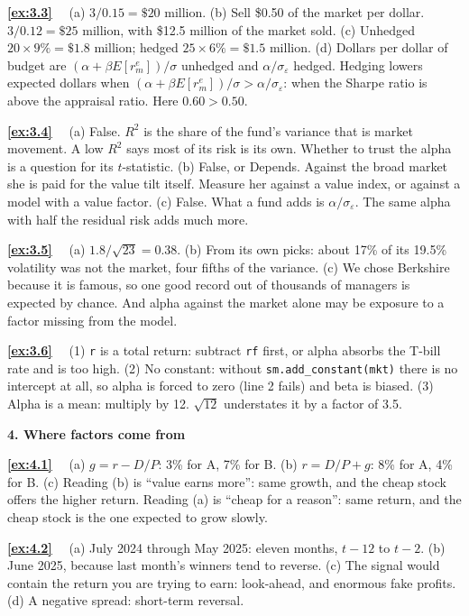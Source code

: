 \documentclass[11pt]{article}
\newcounter{ex}[section]
\newcommand{\sol}[1]{\par\smallskip\textbf{\ref{#1}}\ \ }
\newcommand{\head}[1]{\par\medskip\textbf{#1}\par}
\newcommand{\re}{r^{e}}
\begin{document}
{\sol{ex:3.3} (a) $3/0.15 = \$20$ million. (b) Sell \$0.50 of the market per dollar. $3/0.12 = \$25$ million, with \$12.5
million of the market sold. (c) Unhedged $20\times 9\% = \$1.8$ million; hedged $25\times 6\% = \$1.5$ million. (d) Dollars per
dollar of budget are $(\alpha + \beta E[\re_{m}])/\sigma$ unhedged and $\alpha/\sigma_{\varepsilon}$ hedged. Hedging lowers
expected dollars when $(\alpha + \beta E[\re_{m}])/\sigma > \alpha/\sigma_{\varepsilon}$: when the Sharpe ratio is above the
appraisal ratio. Here $0.60 > 0.50$.

\sol{ex:3.4} (a) False. $R^{2}$ is the share of the fund's variance that is market movement. A low $R^{2}$ says most of
its risk is its own. Whether to trust the alpha is a question for its $t$-statistic. (b) False, or Depends. Against the
broad market she is paid for the value tilt itself. Measure her against a value index, or against a model with a value
factor. (c) False. What a fund adds is $\alpha/\sigma_{\varepsilon}$. The same alpha with half the residual risk adds much more.

\sol{ex:3.5} (a) $1.8/\sqrt{23} = 0.38$. (b) From its own picks: about 17\% of its 19.5\% volatility was not the market,
four fifths of the variance. (c) We chose Berkshire because it is famous, so one good record out of thousands of
managers is expected by chance. And alpha against the market alone may be exposure to a factor missing from the model.

\sol{ex:3.6} (1) \texttt{r} is a total return: subtract \texttt{rf} first, or alpha absorbs the T-bill rate and is too
high. (2) No constant: without \texttt{sm.add\_constant(mkt)} there is no intercept at all, so alpha is forced to zero
(line 2 fails) and beta is biased. (3) Alpha is a mean: multiply by 12. $\sqrt{12}$ understates it by a factor of 3.5.

\head{4. Where factors come from}

\sol{ex:4.1} (a) $g = r - D/P$: 3\% for A, 7\% for B. (b) $r = D/P + g$: 8\% for A, 4\% for B. (c) Reading (b) is ``value
earns more'': same growth, and the cheap stock offers the higher return. Reading (a) is ``cheap for a reason'': same
return, and the cheap stock is the one expected to grow slowly.

\sol{ex:4.2} (a) July 2024 through May 2025: eleven months, $t-12$ to $t-2$. (b) June 2025, because last month's winners
tend to reverse. (c) The signal would contain the return you are trying to earn: look-ahead, and enormous fake profits.
(d) A negative spread: short-term reversal.

}
\end{document}
